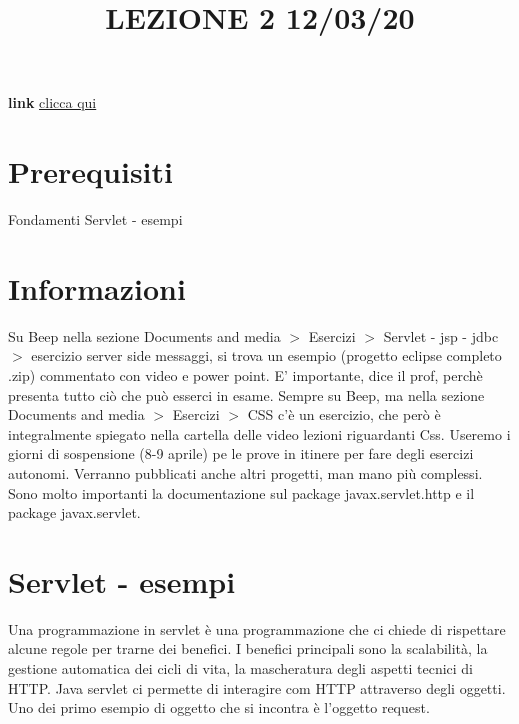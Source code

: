 \title{LEZIONE 2 12/03/20}\newline
\textbf{link} \href{https://web.microsoftstream.com/video/53d9a40e-3109-44fc-8195-0553eedfb6d9}{clicca qui}
\section*{Prerequisiti}
Fondamenti Servlet - esempi
\section*{Informazioni}
Su Beep nella sezione Documents and media $>$ Esercizi $>$ Servlet - jsp - jdbc $>$ esercizio server side messaggi, si trova un esempio (progetto eclipse completo .zip) commentato con video e power point. E' importante, dice il prof, perchè presenta tutto ciò che può esserci in esame.\newline
\newline
Sempre su Beep, ma nella sezione Documents and media $>$ Esercizi $>$ CSS c'è un esercizio, che però è integralmente spiegato nella cartella delle video lezioni riguardanti Css.\newline
\newline
Useremo i giorni di sospensione (8-9 aprile) pe le prove in itinere per fare degli esercizi autonomi.\newline
\newline
Verranno pubblicati anche altri progetti, man mano più complessi.\newline
\newline
Sono molto importanti la documentazione sul package javax.servlet.http e il package javax.servlet.
\section{Servlet - esempi}
Una programmazione in servlet è una programmazione che ci chiede di rispettare alcune regole per trarne dei benefici. I benefici principali sono la scalabilità, la gestione automatica dei cicli di vita, la mascheratura degli aspetti tecnici di HTTP. Java servlet ci permette di interagire com HTTP attraverso degli oggetti. Uno dei primo esempio di oggetto che si incontra è l'oggetto request.
